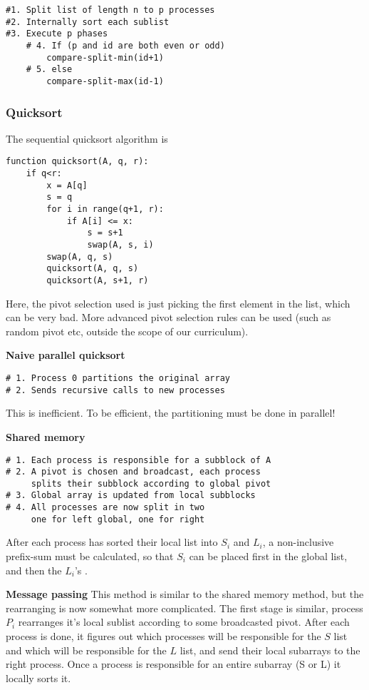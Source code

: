\documentclass[a4paper,10pt,twoside,twocolumn]{article}
\renewcommand{\(}{\left(}
\renewcommand{\)}{\right)}
\newcommand{\header}[1]{\subsubsection*{#1} \vspace{-0.2cm}}
\begin{document}
\begin{verbatim}
#1. Split list of length n to p processes
#2. Internally sort each sublist
#3. Execute p phases
    # 4. If (p and id are both even or odd)
        compare-split-min(id+1)
    # 5. else
        compare-split-max(id-1)
\end{verbatim}

\newpage

\header{Quicksort} 
The sequential quicksort algorithm is
\begin{verbatim}
function quicksort(A, q, r):
    if q<r:
        x = A[q]
        s = q
        for i in range(q+1, r):
            if A[i] <= x:
                s = s+1
                swap(A, s, i)
        swap(A, q, s)
        quicksort(A, q, s)
        quicksort(A, s+1, r)
\end{verbatim}
Here, the pivot selection used is just picking the first element in the list, which can be very bad. More advanced pivot selection rules can be used (such as random pivot etc, outside the scope of our curriculum).

\textbf{Naive parallel quicksort}
\begin{verbatim}
# 1. Process 0 partitions the original array
# 2. Sends recursive calls to new processes
\end{verbatim}
This is inefficient. To be efficient, the partitioning must be done in parallel!

\textbf{Shared memory}
\begin{verbatim}
# 1. Each process is responsible for a subblock of A
# 2. A pivot is chosen and broadcast, each process
     splits their subblock according to global pivot
# 3. Global array is updated from local subblocks
# 4. All processes are now split in two
     one for left global, one for right
\end{verbatim}
After each process has sorted their local list into $S_i$ and $L_i$, a non-inclusive prefix-sum must be calculated, so that $S_i$ can be placed first in the global list, and then the $L_i$'s
.

\textbf{Message passing}
This method is similar to the shared memory method, but the rearranging is now somewhat more complicated. The first stage is similar, process $P_i$ rearranges it's local sublist according to some broadcasted pivot. After each process is done, it figures out which processes will be responsible for the $S$ list and which will be responsible for the $L$ list, and send their local subarrays to the right process. Once a process is responsible for an entire subarray (S or L) it locally sorts it.
\end{document}
